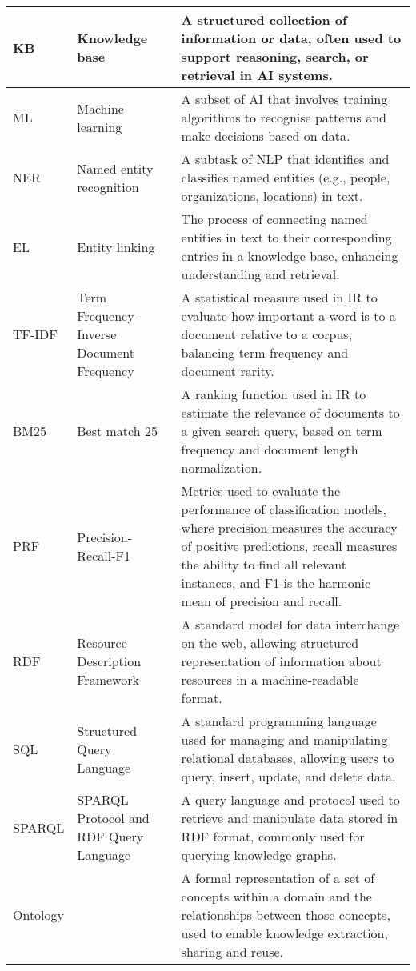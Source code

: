 \begin{tabularx}{\textwidth}{
  >{\raggedright\arraybackslash}p{2.5cm}
  >{\raggedright\arraybackslash}p{4cm}
  >{\noindent\justifying\arraybackslash}X
}
\cmidrule(lr){1-3}
KB    & Knowledge base & A structured collection of information or data, often used to support reasoning, search, or retrieval in AI systems. \\
\cmidrule(lr){1-3}
ML    & Machine learning & A subset of AI that involves training algorithms to recognise patterns and make decisions based on data. \\
\cmidrule(lr){1-3}
NER   & Named entity recognition & A subtask of NLP that identifies and classifies named entities (e.g., people, organizations, locations) in text. \\
\cmidrule(lr){1-3}
EL    & Entity linking & The process of connecting named entities in text to their corresponding entries in a knowledge base, enhancing understanding and retrieval. \\
\cmidrule(lr){1-3}
TF-IDF & Term Frequency-Inverse Document Frequency & A statistical measure used in IR to evaluate how important a word is to a document relative to a corpus, balancing term frequency and document rarity. \\
\cmidrule(lr){1-3}
BM25  & Best match 25 & A ranking function used in IR to estimate the relevance of documents to a given search query, based on term frequency and document length normalization.\\
\cmidrule(lr){1-3}
PRF   & Precision-Recall-F1 & Metrics used to evaluate the performance of classification models, where precision measures the accuracy of positive predictions, recall measures the ability to find all relevant instances, and F1 is the harmonic mean of precision and recall. \\
\cmidrule(lr){1-3}
RDF   & Resource Description Framework & A standard model for data interchange on the web, allowing structured representation of information about resources in a machine-readable format. \\
\cmidrule(lr){1-3}
SQL   & Structured Query Language & A standard programming language used for managing and manipulating relational databases, allowing users to query, insert, update, and delete data. \\
\cmidrule(lr){1-3}
SPARQL & SPARQL Protocol and RDF Query Language & A query language and protocol used to retrieve and manipulate data stored in RDF format, commonly used for querying knowledge graphs. \\
\cmidrule(lr){1-3}  
Ontology &  & A formal representation of a set of concepts within a domain and the relationships between those concepts, used to enable knowledge extraction, sharing and reuse. \\

\end{tabularx}
